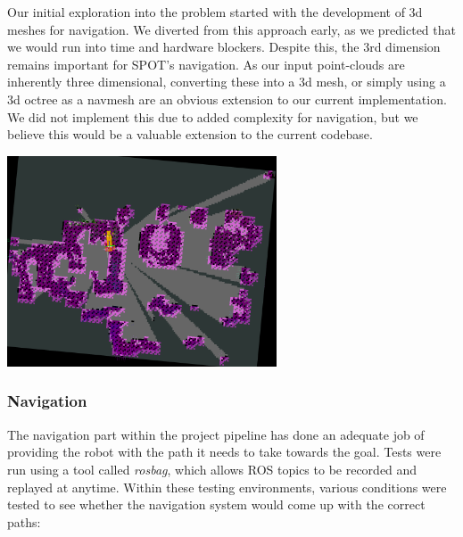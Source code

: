 \documentclass[10pt,english]{article}
\begin{document}
Our initial exploration into the problem started with the development of 3d meshes for navigation. We diverted from this approach early, as we predicted that we would run into time and hardware blockers. Despite this, the 3rd dimension remains important for SPOT's navigation. As our input point-clouds are inherently three dimensional, converting these into a 3d mesh, or simply using a 3d octree as a navmesh are an obvious extension to our current implementation. We did not implement this due to added complexity for navigation, but we believe this would be a valuable extension to the current codebase.

\vspace*{\fill}
\begin{center}
\includegraphics[width=0.6\textwidth]{images/BigMap.png}
\linebreak
\linebreak
{}
\end{center}
\vfill

\subsubsection*{Navigation}

The navigation part within the project pipeline has done an adequate job of providing the robot with the path it needs to take towards the goal. Tests were run using a tool called \textit{rosbag}, which allows ROS topics to be recorded and replayed at anytime. Within these testing environments, various conditions were tested to see whether the navigation system would come up with the correct paths:
\end{document}
